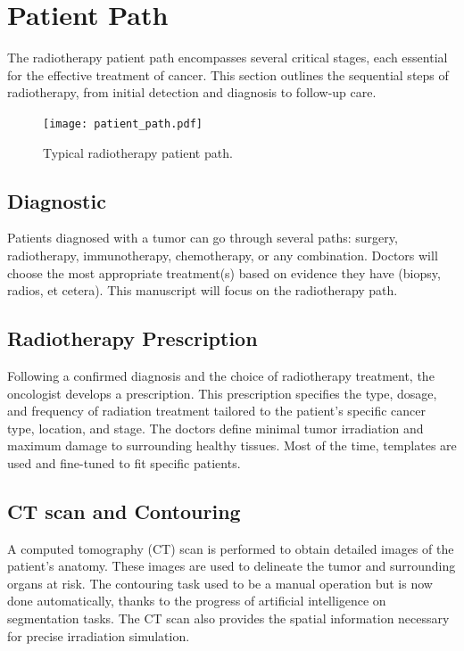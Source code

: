 


\section{Patient Path}
The radiotherapy patient path encompasses several critical stages, each essential for the effective treatment of cancer.
This section outlines the sequential steps of radiotherapy, from initial detection and diagnosis to follow-up care.
\begin{figure}
	\centering
	\texttt{[image: patient\_path.pdf]}
	\caption{Typical radiotherapy patient path.}
	\label{fig:patient_path}
\end{figure}

\subsection{Diagnostic}
Patients diagnosed with a tumor can go through several paths: surgery, radiotherapy, immunotherapy, chemotherapy, or any combination.
Doctors will choose the most appropriate treatment(s) based on evidence they have (biopsy, radios, et cetera).
This manuscript will focus on the radiotherapy path.

\subsection{Radiotherapy Prescription}
Following a confirmed diagnosis and the choice of radiotherapy treatment, the oncologist develops a prescription.
This prescription specifies the type, dosage, and frequency of radiation treatment tailored to the patient's specific cancer type, location, and stage.
The doctors define minimal tumor irradiation and maximum damage to surrounding healthy tissues.
Most of the time, templates are used and fine-tuned to fit specific patients.

\subsection{CT scan and Contouring}
A computed tomography (CT) scan is performed to obtain detailed images of the patient's anatomy.
These images are used to delineate the tumor and surrounding organs at risk.
The contouring task used to be a manual operation but is now done automatically, thanks to the progress of artificial intelligence on segmentation tasks.
The CT scan also provides the spatial information necessary for precise irradiation simulation.


